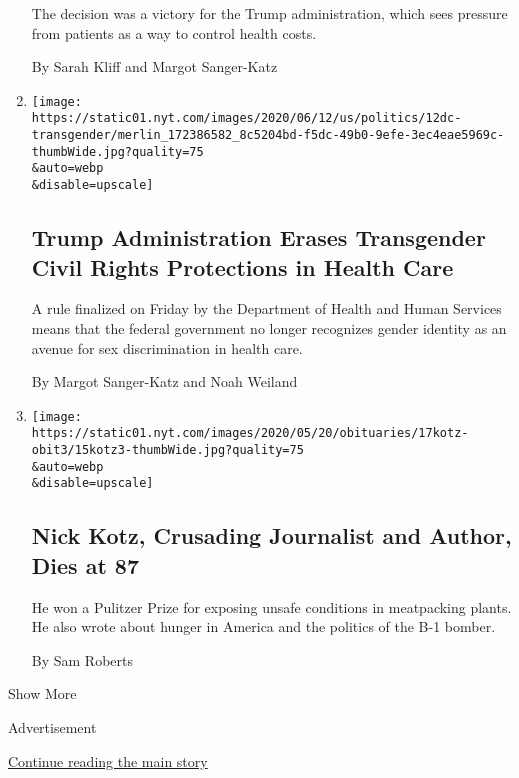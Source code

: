 \begin{enumerate}
  The decision was a victory for the Trump administration, which sees
  pressure from patients as a way to control health costs.

  By Sarah Kliff and Margot Sanger-Katz
\item
  \href{/2020/06/12/us/politics/trump-transgender-rights.html}{}

  \texttt{[image: https://static01.nyt.com/images/2020/06/12/us/politics/12dc-transgender/merlin\_172386582\_8c5204bd-f5dc-49b0-9efe-3ec4eae5969c-thumbWide.jpg?quality=75\\\&auto=webp\\\&disable=upscale]}

  \hypertarget{trump-administration-erases-transgender-civil-rights-protections-in-health-care}{%
  \subsection{Trump Administration Erases Transgender Civil Rights
  Protections in Health
  Care}\label{trump-administration-erases-transgender-civil-rights-protections-in-health-care}}

  A rule finalized on Friday by the Department of Health and Human
  Services means that the federal government no longer recognizes gender
  identity as an avenue for sex discrimination in health care.

  By Margot Sanger-Katz and Noah Weiland
\item
  \href{/2020/05/15/business/media/nick-kotz-dead.html}{}

  \texttt{[image: https://static01.nyt.com/images/2020/05/20/obituaries/17kotz-obit3/15kotz3-thumbWide.jpg?quality=75\\\&auto=webp\\\&disable=upscale]}

  \hypertarget{nick-kotz-crusading-journalist-and-author-dies-at-87}{%
  \subsection{Nick Kotz, Crusading Journalist and Author, Dies at
  87}\label{nick-kotz-crusading-journalist-and-author-dies-at-87}}

  He won a Pulitzer Prize for exposing unsafe conditions in meatpacking
  plants. He also wrote about hunger in America and the politics of the
  B-1 bomber.

  By Sam Roberts
\end{enumerate}

Show More

Advertisement

\protect\hyperlink{after-mid1}{Continue reading the main story}


